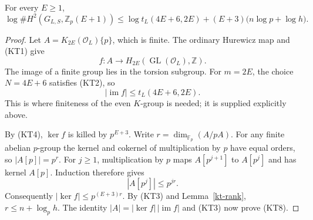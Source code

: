 \begin{proposition}\label{kt-additive}
For every \(E\ge1\),
\[
 \log\#H^2(G_{L,S},\mathbb Z_p(E+1))
 \le
 \log t_L(4E+6,2E)
       +(E+3)\bigl(n\log p+\log h\bigr).
 \tag{KT8}
\]
\end{proposition}
\begin{proof}
Let \(A=K_{2E}(\mathcal O_L)\{p\}\), which is finite.
The ordinary Hurewicz map and (KT1) give
\[
 f:A\longrightarrow
               H_{2E}(\operatorname{GL}(\mathcal O_L),\mathbb Z).
\]
The image of a finite group lies in the torsion subgroup.
For \(m=2E\), the choice \(N=4E+6\) satisfies (KT2),
so
\[
                  |\operatorname{im}f|
                              \le t_L(4E+6,2E).
\]
This is where finiteness of the even \(K\)-group is
needed; it is supplied explicitly above.

By (KT4), \(\ker f\) is killed by \(p^{E+3}\).
Write \(r=\dim_{\mathbb F_p}(A/pA)\).
For any finite abelian \(p\)-group the kernel and
cokernel of multiplication by \(p\) have equal orders,
so \(|A[p]|=p^r\).
For \(j\ge1\), multiplication by \(p\) maps
\(A[p^{j+1}]\) to \(A[p^j]\) and has kernel \(A[p]\).
Induction therefore gives
\[
                 |A[p^j]|\le p^{jr}.
\]
Consequently \(|\ker f|\le p^{(E+3)r}\).
By (KT3) and Lemma~\ref{kt-rank},
\(r\le n+\log_p h\).
The identity \(|A|=|\ker f|\,|\operatorname{im}f|\)
and (KT3) now prove (KT8).
\end{proof}

